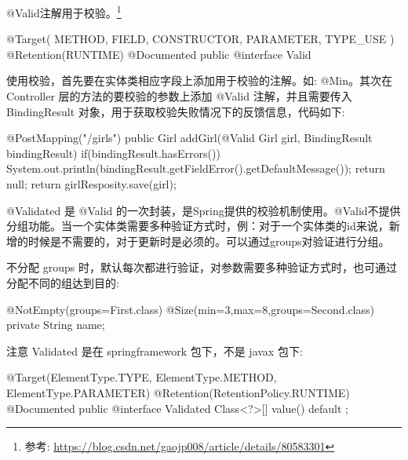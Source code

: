 @Valid注解用于校验。\footnote{参考: \url{https://blog.csdn.net/gaojp008/article/details/80583301}}

\begin{Java}
@Target({ METHOD, FIELD, CONSTRUCTOR, PARAMETER, TYPE_USE })
@Retention(RUNTIME)
@Documented
public @interface Valid {
}
\end{Java}

使用校验，首先要在实体类相应字段上添加用于校验的注解。如: @Min。其次在 Controller 层的方法的要校验的参数上添加 @Valid 注解，并且需要传入 BindingResult 对象，用于获取校验失败情况下的反馈信息，代码如下:

\begin{Java}
@PostMapping("/girls")  
public Girl addGirl(@Valid Girl girl, BindingResult bindingResult) {  
    if(bindingResult.hasErrors()){  
        System.out.println(bindingResult.getFieldError().getDefaultMessage());  
        return null;  
    }  
    return girlResposity.save(girl);  
}
\end{Java}

@Validated 是 @Valid 的一次封装，是Spring提供的校验机制使用。@Valid不提供分组功能。当一个实体类需要多种验证方式时，例：对于一个实体类的id来说，新增的时候是不需要的，对于更新时是必须的。可以通过groups对验证进行分组。

不分配 groups 时，默认每次都进行验证，对参数需要多种验证方式时，也可通过分配不同的组达到目的:

\begin{Java}
@NotEmpty(groups={First.class})  
@Size(min=3,max=8,groups={Second.class})  
private String name;  
\end{Java}

注意 Validated 是在 springframework 包下，不是 javax 包下:

\begin{Java}
@Target({ElementType.TYPE, ElementType.METHOD, ElementType.PARAMETER})
@Retention(RetentionPolicy.RUNTIME)
@Documented
public @interface Validated {
    Class<?>[] value() default {};
}
\end{Java}

\newpage